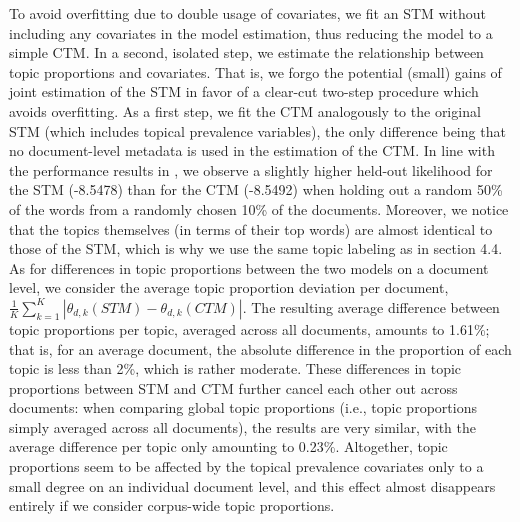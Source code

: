 \documentclass[12pt]{article}
\begin{document}
To avoid overfitting due to double usage of covariates, we fit an STM without including any covariates in the model estimation, thus reducing the model to a simple CTM. In a second, isolated step, we estimate the relationship between topic proportions and covariates. That is, we forgo the potential (small) gains of joint estimation of the STM in favor of a clear-cut two-step procedure which avoids overfitting. As a first step, we fit the CTM analogously to the original STM (which includes topical prevalence variables), the only difference being that no document-level metadata is used in the estimation of the CTM. In line with the performance results in \cite{roberts2016model}, we observe a slightly higher held-out likelihood for the STM (-8.5478) than for the CTM (-8.5492) when holding out a random 50\% of the words from a randomly chosen 10\% of the documents. Moreover, we notice that the topics themselves (in terms of their top words) are almost identical to those of the STM, which is why we use the same topic labeling as in section 4.4. As for differences in topic proportions between the two models on a document level, we consider the average topic proportion deviation per document, $\frac{1}{K}\sum_{k=1}^{K}|\theta_{d,k}(STM)-\theta_{d,k}(CTM)|$. The resulting average difference between topic proportions per topic, averaged across all documents, amounts to 1.61\%; that is, for an average document, the absolute difference in the proportion of each topic is less than 2\%, which is rather moderate. These differences in topic proportions between STM and CTM further cancel each other out across documents: when comparing global topic proportions (i.e., topic proportions simply averaged across all documents), the results are very similar, with the average difference per topic only
amounting to 0.23\%. Altogether, topic proportions seem to be affected by the topical prevalence covariates only to a small degree on an individual document level, and this effect almost disappears entirely if we consider corpus-wide topic proportions.
\end{document}
